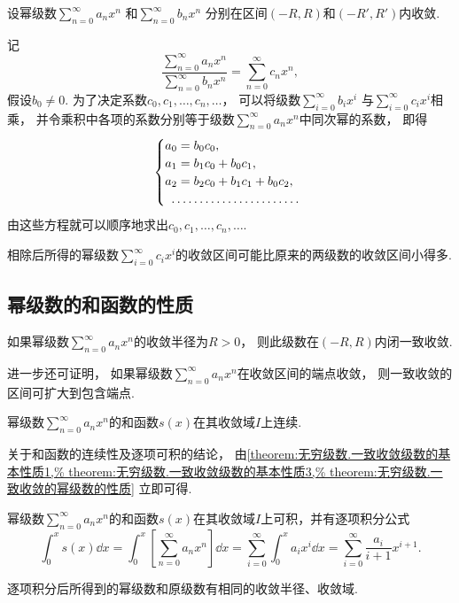 \begin{definition}
设幂级数\(\sum\limits_{n=0}^\infty a_n x^n\)
和\(\sum\limits_{n=0}^\infty b_n x^n\)
分别在区间\((-R,R)\)和\((-R',R')\)内收敛.

记\[
	\frac{
		\sum\limits_{n=0}^\infty a_n x^n
	}{
		\sum\limits_{n=0}^\infty b_n x^n
	}
	= \sum\limits_{n=0}^\infty c_n x^n,
\]
假设\(b_0 \neq 0\).
为了决定系数\(c_0,c_1,\dotsc,c_n,\dotsc\)，
可以将级数\(\sum\limits_{i=0}^\infty b_i x^i\)
与\(\sum\limits_{i=0}^\infty c_i x^i\)相乘，
并令乘积中各项的系数分别等于级数\(\sum\limits_{n=0}^\infty a_n x^n\)中同次幂的系数，
即得\[
	\begin{cases}
		a_0 = b_0 c_0, \\
		a_1 = b_1 c_0 + b_0 c_1, \\
		a_2 = b_2 c_0 + b_1 c_1 + b_0 c_2, \\
		\hdotsfor{1} \\
	\end{cases}
\]
由这些方程就可以顺序地求出\(c_0,c_1,\dotsc,c_n,\dotsc\).

相除后所得的幂级数\(\sum\limits_{i=0}^\infty c_i x^i\)的收敛区间可能比原来的两级数的收敛区间小得多.
\end{definition}

\subsection{幂级数的和函数的性质}
\begin{property}\label{theorem:无穷级数.一致收敛的幂级数的性质}
如果幂级数\(\sum\limits_{n=0}^\infty a_n x^n\)的收敛半径为\(R>0\)，
则此级数在\((-R,R)\)内闭一致收敛.
\end{property}
进一步还可证明，
如果幂级数\(\sum\limits_{n=0}^\infty a_n x^n\)在收敛区间的端点收敛，
则一致收敛的区间可扩大到包含端点.

\begin{property}\label{theorem:无穷级数.幂级数的和函数的性质1}
幂级数\(\sum\limits_{n=0}^\infty a_n x^n\)的和函数\(s(x)\)在其收敛域\(I\)上连续.
\end{property}

关于和函数的连续性及逐项可积的结论，
由\cref{theorem:无穷级数.一致收敛级数的基本性质1,%
theorem:无穷级数.一致收敛级数的基本性质3,%
theorem:无穷级数.一致收敛的幂级数的性质}
立即可得.

\begin{property}\label{theorem:无穷级数.幂级数的和函数的性质2}
幂级数\(\sum\limits_{n=0}^\infty a_n x^n\)的和函数\(s(x)\)在其收敛域\(I\)上可积，并有逐项积分公式\[
\int_0^x s(x) \dd{x}
=\int_0^x \left[\sum\limits_{n=0}^\infty a_n x^n\right] \dd{x}
=\sum\limits_{i=0}^\infty \int_0^x a_i x^i \dd{x}
=\sum\limits_{i=0}^\infty \frac{a_i}{i+1} x^{i+1}.
\]

逐项积分后所得到的幂级数和原级数有相同的收敛半径、收敛域.
\end{property}


